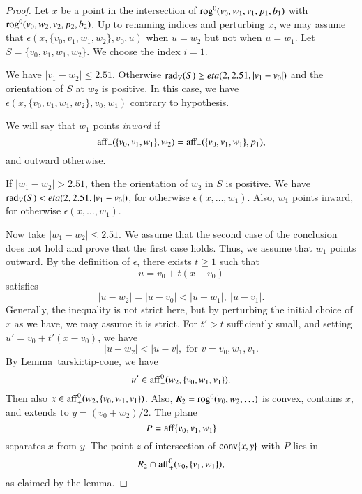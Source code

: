 \begin{tarskidata}
\begin{tarski}
\begin{proof}
Let $x$ be a point in the intersection of ${\operatorname{rog}}^0(v_0,w_1,v_1,p_1,b_1)$ 
with ${\operatorname{rog}}^0(v_0,w_2,v_2,p_2,b_2)$.  Up to renaming indices and perturbing $x$,
we may assume that
$\epsilon(x,\{v_0,v_1,w_1,w_2\},v_0,u)$ when $u=w_2$ but not when $u=w_1$.  
Let $S=\{v_0,v_1,w_1,w_2\}$.
We choose the index $i=1$.

We have $|v_1-w_2|\le 2.51$. 
Otherwise $\operatorname{rad}_V(S) \ge eta(2,2.51,|v_1-v_0|)$ and
the orientation of $S$ at $w_2$ is positive.  In this case, we have
$\epsilon(x,\{v_0,v_1,w_1,w_2\},v_0,w_1)$ contrary to hypothesis.  

We will say that $w_1$ points {\it inward} if
     $$
     {\operatorname{aff}}_+(\{v_0,v_1,w_1\},w_2) = {\operatorname{aff}}_+(\{v_0,v_1,w_1\},p_1),
     $$
and outward otherwise.

If $|w_1-w_2|> 2.51$, then the orientation of $w_2$ in $S$ is positive.
We have $\operatorname{rad}_V(S) < eta(2,2.51,|v_1-v_0|)$, for otherwise
$\epsilon(x,\ldots,w_1)$.   Also, $w_1$ points inward, for otherwise
$\epsilon(x,\ldots,w_1)$.

Now take $|w_1-w_2|\le 2.51$. 
We assume that the second case of the conclusion does not hold and prove that
the first case holds.  Thus, we assume that $w_1$ points outward.
By the definition of $\epsilon$, there exists $t\ge 1$ such
that $$u = v_0 + t (x- v_0)$$ satisfies
$$|u - w_2|=|u-v_0| < |u-w_1|,\ |u-v_1|.$$
Generally, the inequality is not strict here, but by perturbing the initial
choice of $x$ as we have, we may assume it is strict.
For $t'>t$ sufficiently small, and setting $u' = v_0 + t'(x-v_0)$, we
have
$$
  |u - w_2| < |u-v|, \text{ for } v = v_0,w_1,v_1.
$$
By Lemma~{tarski:tip-cone}, we have
$$
  u' \in {\operatorname{aff}}_+^0(w_2,\{v_0,w_1,v_1\}).
$$
Then also $x \in{\operatorname{aff}}_+^0(w_2,\{v_0,w_1,v_1\})$.
Also, $R_2 = {\operatorname{rog}}^0(v_0,w_2,\ldots)$
is convex, contains $x$, and extends to $y=(v_0+w_2)/2$.  
The plane
$$P  ={\operatorname{aff}}\{v_0,v_1,w_1\}$$ separates $x$ from $y$.  The point $z$
of intersection of ${\operatorname{conv}}\{x,y\}$ with $P$ lies in
   $$R_2 \cap {\operatorname{aff}}_+^0(v_0,\{v_1,w_1\}),$$
as claimed by the lemma.
\end{proof}
\end{tarski}











\end{tarskidata}
